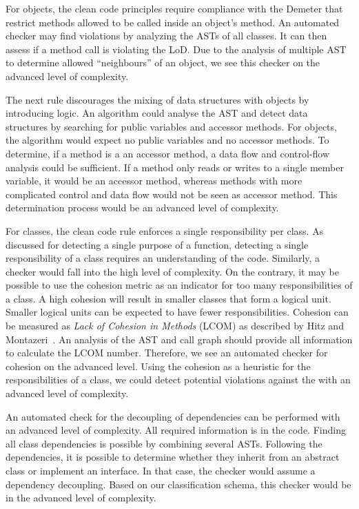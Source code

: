For objects, the clean code principles require compliance with the Demeter that restrict methods allowed to be called inside an object's method. An automated checker may find violations by analyzing the ASTs of all classes. It can then assess if a method call is violating the LoD. Due to the analysis of multiple AST to determine allowed \enquote{neighbours} of an object, we see this checker on the advanced level of complexity.

The next rule discourages the mixing of data structures with objects by introducing logic. An algorithm could analyse the AST and detect data structures by searching for public variables and accessor methods. For objects, the algorithm would expect no public variables and no accessor methods. To determine, if a method is a an accessor method, a data flow and control-flow analysis could be sufficient. If a method only reads or writes to a single member variable, it would be an accessor method, whereas methods with more complicated control and data flow would not be seen as accessor method. This determination process would be an advanced level of complexity.

For classes, the clean code rule enforces a single responsibility per class. As discussed for detecting a single purpose of a function, detecting a single responsibility of a class requires an understanding of the code. Similarly, a checker would fall into the high level of complexity. On the contrary, it may be possible to use the cohesion metric as an indicator for too many responsibilities of a class. A high cohesion will result in smaller classes that form a logical unit. Smaller logical units can be expected to have fewer responsibilities. Cohesion can be measured as \textit{Lack of Cohesion in Methods} (LCOM) as described by Hitz and Montazeri~\cite{Hitz95measuringcoupling}. An analysis of the AST and call graph should provide all information to calculate the LCOM number. Therefore, we see an automated checker for cohesion on the advanced level. Using the cohesion as a heuristic for the responsibilities of a class, we could detect potential violations against the  with an advanced level of complexity.

An automated check for the decoupling of dependencies can be performed with an advanced level of complexity. All required information is in the code. Finding all class dependencies is possible by combining several ASTs. Following the dependencies, it is possible to determine whether they inherit from an abstract class or implement an interface. In that case, the checker would assume a dependency decoupling. Based on our classification schema, this checker would be in the advanced level of complexity.

